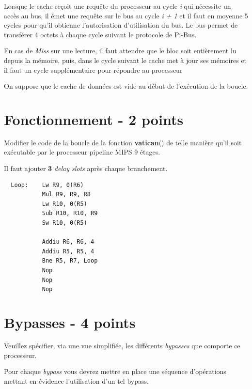 {Lorsque le cache re\c{c}oit une requ\^ete du processeur au cycle \textit{i}
qui n\'ecessite un acc\`es au bus, il \'emet une requ\^ete sur le bus au
cycle \textit{i + 1} et il faut en moyenne 5 cycles pour qu'il obtienne
l'autorisation d'utilisation du bus. Le bus permet de transf\'erer 4 octets
\`a chaque cycle suivant le protocole de Pi-Bus.

En cas de \textit{Miss} sur une lecture, il faut attendre que le bloc soit
enti\`erement lu depuis la m\'emoire, puis, dans le cycle suivant le cache
met \`a jour ses m\'emoires et il faut un cycle suppl\'ementaire pour
r\'epondre au processeur

On suppose que le cache de donn\'ees est vide au d\'ebut de l'ex\'ecution
de la boucle.

%
%

\section{Fonctionnement - 2 points}

Modifier le code de la boucle de la fonction \textbf{vatican}() de telle
mani\`ere qu'il soit ex\'ecutable par le processeur pipeline MIPS 9 \'etages.

\begin{correction}

  Il faut ajouter \textbf{3} \textit{delay slots} apr\`es chaque
  branchement.

  \begin{verbatim}
  Loop:    Lw R9, 0(R6)
           Mul R9, R9, R8
           Lw R10, 0(R5)
           Sub R10, R10, R9
           Sw R10, 0(R5)

           Addiu R6, R6, 4
           Addiu R5, R5, 4
           Bne R5, R7, Loop
           Nop
           Nop
           Nop
  \end{verbatim}

\end{correction}

%
%

\section{Bypasses - 4 points}

Veuillez sp\'ecifier, via une vue simplifi\'ee, les diff\'erents
\textit{bypasses} que comporte ce processeur.

Pour chaque \textit{bypass} vous devrez mettre en place une s\'equence
d'op\'erations mettant en \'evidence l'utilisation d'un tel bypass.

}
